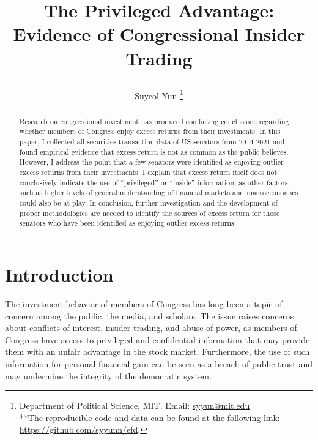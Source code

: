\documentclass[12pt,letterpaper]{article}
\newcommand{\tit}{
\bf 
The Privileged Advantage: Evidence of Congressional Insider Trading
}
\newcommand\spacingset[1]{\renewcommand{\baselinestretch}
{#1}\small\normalsize}
\begin{document}
\spacingset{1.25}

\setcounter{page}{0}
\vspace{-.1in}

{\title{
    \tit
  }
  \author{
    Suyeol Yun
  \thanks{Department of Political Science, MIT. Email: \href{mailto:syyun@mit.edu}{syyun@mit.edu}\\
  **The reproducible code and data can be found at the following link: \href{https://github.com/syyunn/efd}{https://github.com/syyunn/efd}.
  }
  }
  \maketitle
}

\thispagestyle{empty}
\vspace{-.1in}

\begin{abstract}
  Research on congressional investment has produced conflicting conclusions regarding whether members of Congress enjoy excess returns from their investments. In this paper, I collected all securities transaction data of US senators from 2014-2021 and found empirical evidence that excess return is not as common as the public believes. However, I address the point that a few senators were identified as enjoying outlier excess returns from their investments. I explain that excess return itself does not conclusively indicate the use of ``privileged'' or ``inside'' information, as other factors such as higher levels of general understanding of financial markets and macroeconomics could also be at play. In conclusion, further investigation and the development of proper methodologies are needed to identify the sources of excess return for those senators who have been identified as enjoying outlier excess returns. 
\spacingset{1.5} %
\end{abstract}
\clearpage

\section{Introduction}
\spacingset{2} %

The investment behavior of members of Congress has long been a topic of concern among the public, the media, and scholars. The issue raises concerns about conflicts of interest, insider trading, and abuse of power, as members of Congress have access to privileged and confidential information that may provide them with an unfair advantage in the stock market. Furthermore, the use of such information for personal financial gain can be seen as a breach of public trust and may undermine the integrity of the democratic system.
\end{document}
